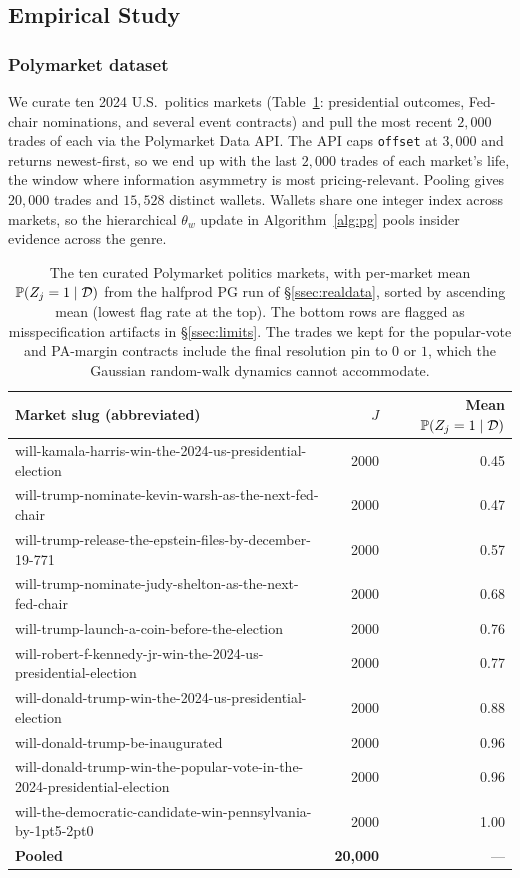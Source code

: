\subsection{Empirical Study}\label{ssec:empirical}

\subsubsection{Polymarket dataset}

We curate ten 2024 U.S.\ politics markets (Table~\ref{tab:markets}: presidential outcomes, Fed-chair nominations, and several event contracts) and pull the most recent $2{,}000$ trades of each via the Polymarket Data API. The API caps \texttt{offset} at $3{,}000$ and returns newest-first, so we end up with the last $2{,}000$ trades of each market's life, the window where information asymmetry is most pricing-relevant. Pooling gives $20{,}000$ trades and $15{,}528$ distinct wallets. Wallets share one integer index across markets, so the hierarchical $\theta_w$ update in Algorithm~\ref{alg:pg} pools insider evidence across the genre.

\begin{table}[t]
\centering\small
\begin{tabular}{lrr}
\toprule
Market slug (abbreviated) & $J$ & Mean $\operatorname{\mathbb{P}}(Z_j = 1\mid\mathcal D)$ \\
\midrule
will-kamala-harris-win-the-2024-us-presidential-election & 2000 & 0.45 \\
will-trump-nominate-kevin-warsh-as-the-next-fed-chair & 2000 & 0.47 \\
will-trump-release-the-epstein-files-by-december-19-771 & 2000 & 0.57 \\
will-trump-nominate-judy-shelton-as-the-next-fed-chair & 2000 & 0.68 \\
will-trump-launch-a-coin-before-the-election & 2000 & 0.76 \\
will-robert-f-kennedy-jr-win-the-2024-us-presidential-election & 2000 & 0.77 \\
will-donald-trump-win-the-2024-us-presidential-election & 2000 & 0.88 \\
will-donald-trump-be-inaugurated & 2000 & 0.96 \\
will-donald-trump-win-the-popular-vote-in-the-2024-presidential-election & 2000 & 0.96 \\
will-the-democratic-candidate-win-pennsylvania-by-1pt5-2pt0 & 2000 & 1.00 \\
\midrule
\textbf{Pooled} & \textbf{20{,}000} & --- \\
\bottomrule
\end{tabular}
\caption{The ten curated Polymarket politics markets, with per-market mean $\operatorname{\mathbb{P}}(Z_j = 1 \mid \mathcal{D})$ from the halfprod PG run of \S\ref{ssec:realdata}, sorted by ascending mean (lowest flag rate at the top). The bottom rows are flagged as misspecification artifacts in \S\ref{ssec:limits}. The trades we kept for the popular-vote and PA-margin contracts include the final resolution pin to $0$ or $1$, which the Gaussian random-walk dynamics cannot accommodate.}
\label{tab:markets}
\end{table}

